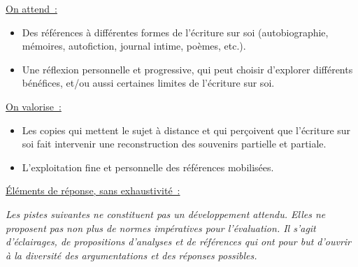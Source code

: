 {\underline{On attend~:}
\begin{itemize}
\item Des références à différentes formes de l'écriture sur soi (autobiographie, mémoires,
autofiction, journal intime, poèmes, etc.).
\item Une réflexion personnelle et progressive, qui peut choisir d'explorer différents bénéfices,
et/ou aussi certaines limites de l'écriture sur soi.
\end{itemize}

\underline{On valorise~:}
\begin{itemize}
\item Les copies qui mettent le sujet à distance et qui perçoivent que l'écriture sur soi fait
intervenir une reconstruction des souvenirs partielle et partiale.
\item L'exploitation fine et personnelle des références mobilisées.
\end{itemize}

\underline{Éléments de réponse, sans exhaustivité~:}

\textit{Les pistes suivantes ne constituent pas un développement attendu. Elles ne proposent pas non
plus de normes impératives pour l'évaluation. Il s'agit d'éclairages, de propositions d'analyses et
de références qui ont pour but d'ouvrir à la diversité des argumentations et des réponses
possibles.}

}
